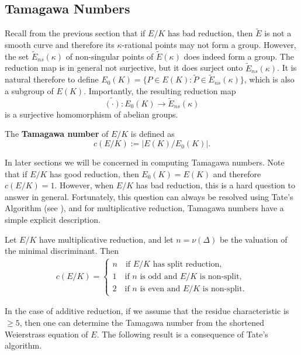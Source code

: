 
\subsection{Tamagawa Numbers} \label{subs_tamagawa}

Recall from the previous section that if $E/K$ has bad reduction, then $\tilde{E}$ is not a smooth curve and therefore its $\kappa$-rational points may not form a group. However, the set $\tilde{E}_{ns}(\kappa)$ of non-singular points of $\tilde{E}(\kappa)$ does indeed form a group. The reduction map is in general not surjective, but it does surject onto $\tilde{E}_{ns}(\kappa)$. It is natural therefore to define $E_0(K)=\{P\in E(K):\widetilde{P}\in\tilde{E}_{ns}(\kappa)\}$, which is also a subgroup of $E(K)$. Importantly, the resulting reduction map 
$$\widetilde{(\cdot)}:E_0(K)\longrightarrow \tilde{E}_{ns}(\kappa)$$
is a surjective homomorphism of abelian groups.
\begin{defn}
    The \textbf{Tamagawa number} of $E/K$ is defined as
    \begin{equation*}
        c(E/K):=|E(K)/E_0(K)|.
    \end{equation*}
\end{defn}
In later sections we will be concerned in computing Tamagawa numbers. Note that if $E/K$ has good reduction, then $E_0(K)=E(K)$ and therefore $c(E/K)=1$. However, when $E/K$ has bad reduction, this is a hard question to answer in general. Fortunately, this question can always be resolved using Tate's Algorithm (see \cite[\S IV.9]{S2}), and for multiplicative reduction, Tamagawa numbers have a simple explicit description.

\begin{lemma}\label{lem_mult_tam}
    Let $E/K$ have multiplicative reduction, and let $n=\nu(\Delta)$ be the valuation of the minimal discriminant. Then
    \begin{align*}
        c(E/K)=
        \begin{cases}
            n \quad\text{if $E/K$ has split reduction,}\\
            1 \quad\text{if $n$ is odd and $E/K$ is non-split,}\\
            2 \quad\text{if $n$ is even and $E/K$ is non-split}.
        \end{cases}    
    \end{align*}
\end{lemma}

In the case of additive reduction, if we assume that the residue characteristic is $\geq 5$, then one can determine the Tamagawa number from the shortened Weierstrass equation of $E$. The following result is a consequence of Tate's algorithm.

